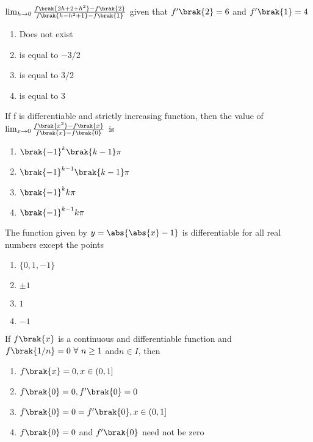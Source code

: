 \item %

	$\lim_{h \to 0} \frac{f\brak{2h+2+h^2}-f\brak{2}}{f\brak{h-h^2+1}-f\brak{1}}$ given that $f^{\prime}\brak{2}=6$ and $f^{\prime}\brak{1}=4$ \hfill{}
    \begin{enumerate}
     \item Does not exist
     \item is equal to $-3/2$
     \item is equal to $3/2$
     \item is equal to $3$\\
    \end{enumerate}


\item %

	If f is differentiable and strictly increasing function, then the value of $\lim_{x \to 0} \frac{f\brak{x^2}-f\brak{x}}{f\brak{x}-f\brak{0}}$ is \hfill{}
    \begin{enumerate}
	    \item $\brak{-1}^k \brak{k-1} \pi$
	    \item $\brak{-1}^{k-1} \brak{k-1} \pi$
	    \item $\brak{-1}^k k\pi$
            \item $\brak{-1}^{k-1} k\pi$\\
    \end{enumerate}


\item %

	The function given by $y=\abs{\abs{x}-1}$ is differentiable for all real numbers except the points \hfill{}
    \begin{enumerate}
     \item $\{0,1,-1\}$
     \item $\pm 1$
     \item $1$
     \item $-1$\\
    \end{enumerate}

\item %

	If $f\brak{x}$ is a continuous and differentiable function and $f\brak{1/n}=0\ \forall\ n\geq1$ and$ n\in I$, then   \hfill{}
    \begin{enumerate}
	    \item $f\brak{x}=0,x\in(0,1]$
	    \item $f\brak{0}=0,f^{\prime}\brak{0}=0$
	    \item $f\brak{0}=0=f^{\prime}\brak{0}, x\in(0,1]$
	    \item $f\brak{0}=0$ and $f^{\prime}\brak{0}$ need not be zero\\
    \end{enumerate}


